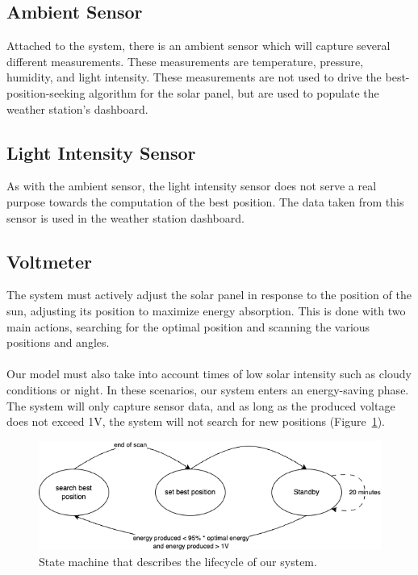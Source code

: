 \subsection*{Ambient Sensor}
Attached to the system, there is an ambient sensor which will capture several
different measurements. These measurements are temperature, pressure, humidity,
and light intensity. These measurements are not used to drive the
best-position-seeking algorithm for the solar panel, but are used to populate
the weather station's dashboard.

\subsection*{Light Intensity Sensor}
As with the ambient sensor, the light intensity sensor does not serve a real
purpose towards the computation of the best position. The data taken from this
sensor is used in the weather station dashboard.

\subsection*{Voltmeter}

The system must actively adjust the solar panel in response to the position of
the sun, adjusting its position to maximize energy absorption. This is done with
two main actions, searching for the optimal position and scanning the various
positions and angles. \\ \\
Our model must also take into account times of low solar intensity such as
cloudy conditions or night. In these scenarios, our system enters an
energy-saving phase. The system will only capture sensor data, and as long as
the produced voltage does not exceed 1V, the system will not search for new
positions (Figure~\ref{fig:seros-sm}).
\begin{figure}[h]
    \centering
    \includegraphics[width=12cm]{../assets/png/servos-state-machine}
    \caption{State machine that describes the lifecycle of our system.}
    \label{fig:seros-sm}
\end{figure}
